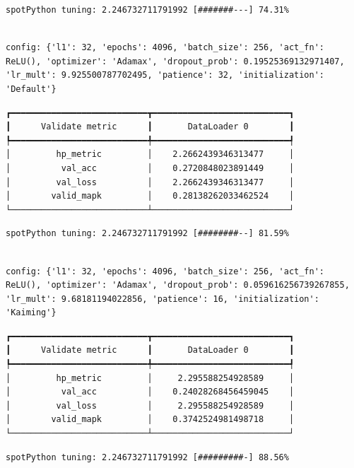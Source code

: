 \documentclass[
  letterpaper,
  DIV=11,
  numbers=noendperiod]{scrreprt}
\begin{document}
\begin{verbatim}
spotPython tuning: 2.246732711791992 [#######---] 74.31% 
\end{verbatim}

\begin{verbatim}

config: {'l1': 32, 'epochs': 4096, 'batch_size': 256, 'act_fn': ReLU(), 'optimizer': 'Adamax', 'dropout_prob': 0.19525369132971407, 'lr_mult': 9.925500787702495, 'patience': 32, 'initialization': 'Default'}
\end{verbatim}

\begin{verbatim}
┏━━━━━━━━━━━━━━━━━━━━━━━━━━━┳━━━━━━━━━━━━━━━━━━━━━━━━━━━┓
┃      Validate metric      ┃       DataLoader 0        ┃
┡━━━━━━━━━━━━━━━━━━━━━━━━━━━╇━━━━━━━━━━━━━━━━━━━━━━━━━━━┩
│         hp_metric         │    2.2662439346313477     │
│          val_acc          │    0.2720848023891449     │
│         val_loss          │    2.2662439346313477     │
│        valid_mapk         │    0.28138262033462524    │
└───────────────────────────┴───────────────────────────┘
\end{verbatim}

\begin{verbatim}
spotPython tuning: 2.246732711791992 [########--] 81.59% 
\end{verbatim}

\begin{verbatim}

config: {'l1': 32, 'epochs': 4096, 'batch_size': 256, 'act_fn': ReLU(), 'optimizer': 'Adamax', 'dropout_prob': 0.059616256739267855, 'lr_mult': 9.68181194022856, 'patience': 16, 'initialization': 'Kaiming'}
\end{verbatim}

\begin{verbatim}
┏━━━━━━━━━━━━━━━━━━━━━━━━━━━┳━━━━━━━━━━━━━━━━━━━━━━━━━━━┓
┃      Validate metric      ┃       DataLoader 0        ┃
┡━━━━━━━━━━━━━━━━━━━━━━━━━━━╇━━━━━━━━━━━━━━━━━━━━━━━━━━━┩
│         hp_metric         │     2.295588254928589     │
│          val_acc          │    0.24028268456459045    │
│         val_loss          │     2.295588254928589     │
│        valid_mapk         │    0.3742524981498718     │
└───────────────────────────┴───────────────────────────┘
\end{verbatim}

\begin{verbatim}
spotPython tuning: 2.246732711791992 [#########-] 88.56% 
\end{verbatim}
\end{document}
